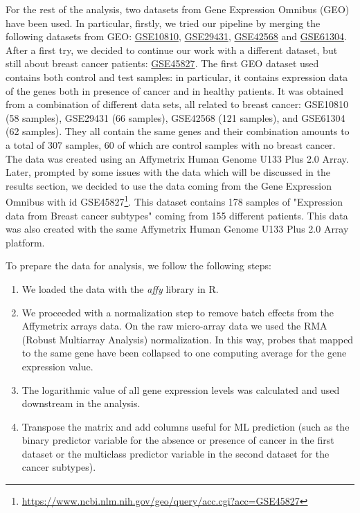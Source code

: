 \documentclass[journal]{IEEEtran}
\begin{document}
For the rest of the analysis, two datasets from Gene Expression Omnibus (GEO) have been used. In particular, firstly, we tried our pipeline by merging the following datasets from GEO: \href{https://www.ncbi.nlm.nih.gov/geo/query/acc.cgi?acc=GSE10810}{GSE10810}\cite{pedraza2010gene}, \href{https://www.ncbi.nlm.nih.gov/geo/query/acc.cgi?acc=GSE29431}{GSE29431}\cite{lopez2012biomedical}, \href{https://www.ncbi.nlm.nih.gov/geo/query/acc.cgi?acc=GSE42568}{GSE42568}\cite{clarke2013correlating} and \href{https://www.ncbi.nlm.nih.gov/geo/query/acc.cgi?acc=GSE61304}{GSE61304}\cite{aswad2015genome}. After a first try, we decided to continue our work with a different dataset, but still about breast cancer patients: \href{https://www.ncbi.nlm.nih.gov/geo/query/acc.cgi?acc=GSE45827}{GSE45827}\cite{Gruosso2016}.\newline
The first GEO dataset used contains both control and test samples: in particular, it contains expression data of the genes both in presence of cancer and in healthy patients. It was obtained from a combination of different data sets, all related to breast cancer: GSE10810 (58 samples), GSE29431 (66 samples), GSE42568 (121 samples), and GSE61304 (62 samples). They all contain the same genes and their combination amounts to a total of 307 samples, 60 of which are control samples with no breast cancer. The data was created using an Affymetrix Human Genome U133 Plus 2.0 Array.
Later, prompted by some issues with the data which will be discussed in the results section, we decided to use the data coming from the Gene Expression Omnibus with id GSE45827\footnote{\url{https://www.ncbi.nlm.nih.gov/geo/query/acc.cgi?acc=GSE45827}}. This dataset contains 178 samples of "Expression data from Breast cancer subtypes" coming from 155 different patients. This data was also created with the same Affymetrix Human Genome U133 Plus 2.0 Array platform. \newline

To prepare the data for analysis, we follow the following steps:
\begin{enumerate}
    \item We loaded the data with the \textit{affy} library\cite{Gautier2004} in R.
    \item We proceeded with a normalization step to remove batch effects from the Affymetrix arrays data. On the raw micro-array data we used the RMA (Robust Multiarray Analysis)\cite{Irizarry2003} normalization. In this way, probes that mapped to the same gene have been collapsed to one computing average for the gene expression value.
    \item The logarithmic value of all gene expression levels was calculated and used downstream in the analysis.
    \item Transpose the matrix and add columns useful for ML prediction (such as the binary predictor variable for the absence or presence of cancer in the first dataset or the multiclass predictor variable in the second dataset for the cancer subtypes).
\end{enumerate}
\end{document}
